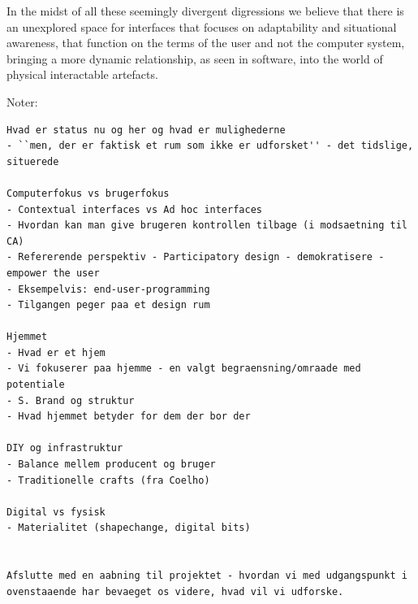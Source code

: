 In the midst of all these seemingly divergent digressions we believe that there is an unexplored space for interfaces that focuses on adaptability and situational awareness, that function on the terms of the user and not the computer system, bringing a more dynamic relationship, as seen in software, into the world of physical interactable artefacts.  

Noter:
\begin{verbatim}
Hvad er status nu og her og hvad er mulighederne
- ``men, der er faktisk et rum som ikke er udforsket'' - det tidslige, situerede

Computerfokus vs brugerfokus
- Contextual interfaces vs Ad hoc interfaces
- Hvordan kan man give brugeren kontrollen tilbage (i modsaetning til CA)
- Refererende perspektiv - Participatory design - demokratisere - empower the user
- Eksempelvis: end-user-programming
- Tilgangen peger paa et design rum

Hjemmet
- Hvad er et hjem
- Vi fokuserer paa hjemme - en valgt begraensning/omraade med potentiale
- S. Brand og struktur
- Hvad hjemmet betyder for dem der bor der

DIY og infrastruktur
- Balance mellem producent og bruger
- Traditionelle crafts (fra Coelho)

Digital vs fysisk
- Materialitet (shapechange, digital bits)


Afslutte med en aabning til projektet - hvordan vi med udgangspunkt i ovenstaaende har bevaeget os videre, hvad vil vi udforske.
\end{verbatim}